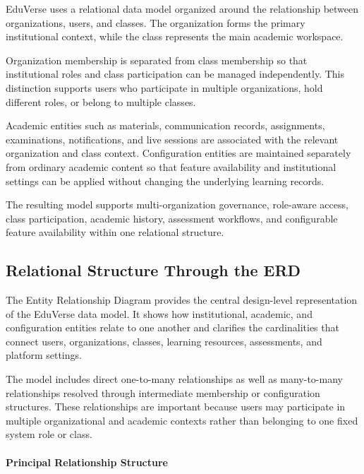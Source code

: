 EduVerse uses a relational data model organized around the relationship
between organizations, users, and classes. The organization forms the primary
institutional context, while the class represents the main academic workspace.

Organization membership is separated from class membership so that
institutional roles and class participation can be managed independently. This
distinction supports users who participate in multiple organizations, hold
different roles, or belong to multiple classes.

Academic entities such as materials, communication records, assignments,
examinations, notifications, and live sessions are associated with the relevant
organization and class context. Configuration entities are maintained
separately from ordinary academic content so that feature availability and
institutional settings can be applied without changing the underlying learning
records.

The resulting model supports multi-organization governance, role-aware access,
class participation, academic history, assessment workflows, and configurable
feature availability within one relational structure.

\subsection{Relational Structure Through the ERD}\label{subsec:entity_relationship_diagram}

The Entity Relationship Diagram provides the central design-level
representation of the EduVerse data model. It shows how institutional,
academic, and configuration entities relate to one another and clarifies the
cardinalities that connect users, organizations, classes, learning resources,
assessments, and platform settings.

The model includes direct one-to-many relationships as well as many-to-many
relationships resolved through intermediate membership or configuration
structures. These relationships are important because users may participate in
multiple organizational and academic contexts rather than belonging to one
fixed system role or class.

\newpage

\paragraph*{Principal Relationship Structure}

